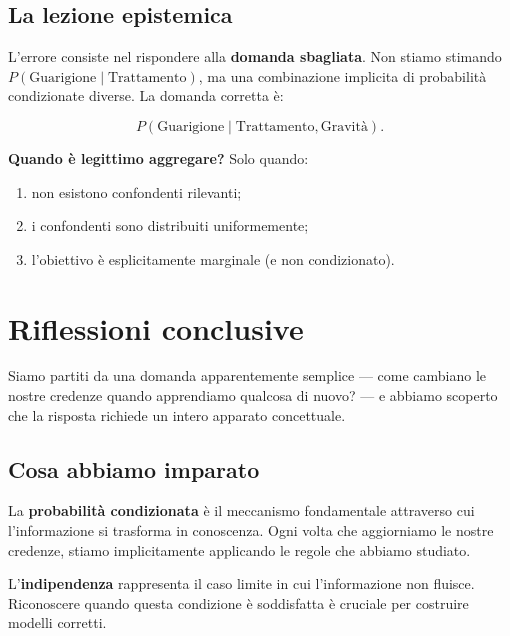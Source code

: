\documentclass[
  italian,
  letterpaper,
  a4paper,
  11pt,
  open=any]{scrbook}
\providecommand{\tightlist}{%
  \setlength{\itemsep}{0pt}\setlength{\parskip}{0pt}}
\theoremstyle{plain}
\theoremstyle{definition}
\theoremstyle{definition}
\theoremstyle{remark}
\begin{document}
\begin{tcolorbox}
\subsection{La lezione epistemica}\label{la-lezione-epistemica}

L'errore consiste nel rispondere alla \textbf{domanda sbagliata}. Non
stiamo stimando \(P(\text{Guarigione} \mid \text{Trattamento})\), ma una
combinazione implicita di probabilità condizionate diverse. La domanda
corretta è:

\[
P(\text{Guarigione} \mid \text{Trattamento}, \text{Gravità}).
\]

\textbf{Quando è legittimo aggregare?} Solo quando:

\begin{enumerate}
\def\labelenumi{\arabic{enumi}.}
\tightlist
\item
  non esistono confondenti rilevanti;
\item
  i confondenti sono distribuiti uniformemente;
\item
  l'obiettivo è esplicitamente marginale (e non condizionato).
\end{enumerate}

\end{tcolorbox}

\section*{Riflessioni conclusive}\label{riflessioni-conclusive-3}


Siamo partiti da una domanda apparentemente semplice --- come cambiano
le nostre credenze quando apprendiamo qualcosa di nuovo? --- e abbiamo
scoperto che la risposta richiede un intero apparato concettuale.

\subsection{Cosa abbiamo imparato}\label{cosa-abbiamo-imparato}

La \textbf{probabilità condizionata} è il meccanismo fondamentale
attraverso cui l'informazione si trasforma in conoscenza. Ogni volta che
aggiorniamo le nostre credenze, stiamo implicitamente applicando le
regole che abbiamo studiato.

L'\textbf{indipendenza} rappresenta il caso limite in cui l'informazione
non fluisce. Riconoscere quando questa condizione è soddisfatta è
cruciale per costruire modelli corretti.
\end{document}
